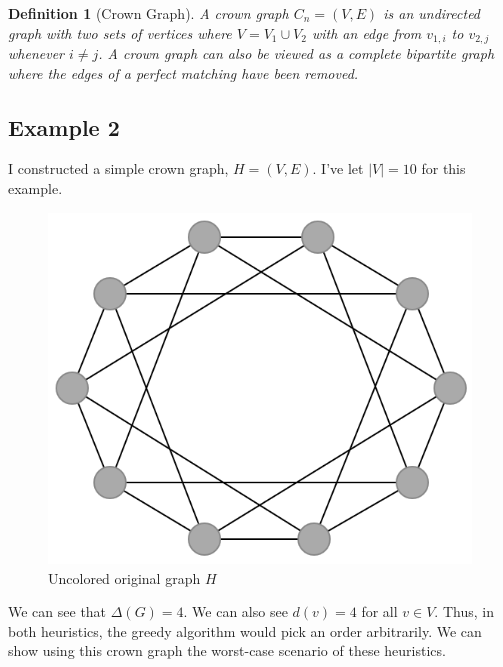 \documentclass{article}
\newtheorem*{definition}{Definition}
\begin{document}
\begin{definition}[Crown Graph]
A crown graph \(C_n = (V, E)\) is an undirected graph with two sets of vertices where \(V = V_1 \cup V_2\) with an edge from \(v_{1,i}\) to \(v_{2,j}\) whenever \(i \neq j\). A crown graph can also be viewed as a complete bipartite graph where the edges of a perfect matching have been removed.
\end{definition}

\subsection*{Example 2}

I constructed a simple crown graph, \(H = (V, E)\). I've let \(|V| = 10\) for this example.

\begin{figure}[H]
\centering
\includegraphics[scale=0.38]{graph-4.png}
\caption{Uncolored original graph \(H\)}
\end{figure}

We can see that \(\Delta(G) = 4\). We can also see \(d(v) = 4\) for all \(v \in V\). Thus, in both heuristics, the greedy algorithm would pick an order arbitrarily. We can show using this crown graph the worst-case scenario of these heuristics.
\end{document}
